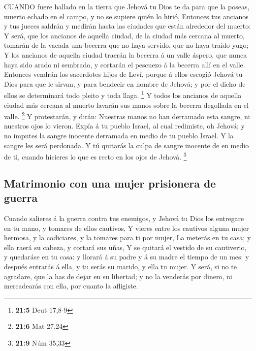  CUANDO fuere hallado en la tierra que Jehová tu Dios te da
para que la poseas, muerto echado en el campo, y no se supiere quién lo
hirió,  Entonces tus ancianos y tus jueces saldrán y medirán
hasta las ciudades que están alrededor del muerto:  Y será,
que los ancianos de aquella ciudad, de la ciudad más cercana al muerto,
tomarán de la vacada una becerra que no haya servido, que no haya traído
yugo;  Y los ancianos de aquella ciudad traerán la becerra á
un valle áspero, que nunca haya sido arado ni sembrado, y cortarán el
pescuezo á la becerra allí en el valle.  Entonces vendrán
los sacerdotes hijos de Leví, porque á ellos escogió Jehová tu Dios para
que le sirvan, y para bendecir en nombre de Jehová; y por el dicho de
ellos se determinará todo pleito y toda llaga. \footnote{\textbf{21:5}
  Deut 17,8-9}  Y todos los ancianos de aquella ciudad más
cercana al muerto lavarán sus manos sobre la becerra degollada en el
valle. \footnote{\textbf{21:6} Mat 27,24}  Y protestarán, y
dirán: Nuestras manos no han derramado esta sangre, ni nuestros ojos lo
vieron.  Expía á tu pueblo Israel, al cual redimiste, oh
Jehová; y no imputes la sangre inocente derramada en medio de tu pueblo
Israel. Y la sangre les será perdonada.  Y tú quitarás la
culpa de sangre inocente de en medio de ti, cuando hicieres lo que es
recto en los ojos de Jehová. \footnote{\textbf{21:9} Núm 35,33}

\hypertarget{matrimonio-con-una-mujer-prisionera-de-guerra}{%
\subsection{Matrimonio con una mujer prisionera de
guerra}\label{matrimonio-con-una-mujer-prisionera-de-guerra}}

 Cuando salieres á la guerra contra tus enemigos, y Jehová
tu Dios los entregare en tu mano, y tomares de ellos cautivos,
 Y vieres entre los cautivos alguna mujer hermosa, y la
codiciares, y la tomares para ti por mujer,  La meterás en
tu casa; y ella raerá su cabeza, y cortará sus uñas,  Y se
quitará el vestido de su cautiverio, y quedaráse en tu casa: y llorará á
su padre y á su madre el tiempo de un mes: y después entrarás á ella, y
tu serás su marido, y ella tu mujer.  Y será, si no te
agradare, que la has de dejar en su libertad; y no la venderás por
dinero, ni mercadearás con ella, por cuanto la afligiste.

